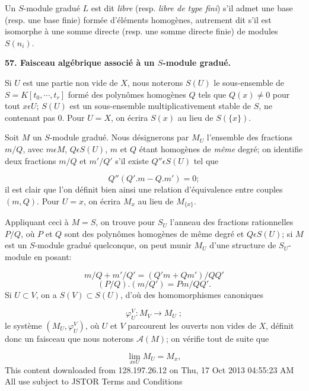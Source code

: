 Un $S$-module gradué $L$ est dit \textit{libre} (resp. \textit{libre de type fini}) s'il admet une base (resp. une base finie) formée d'éléments homogènes, autrement dit s'il est isomorphe à une somme directe (resp. une somme directe finie) de modules $S(n_i)$.


\textbf{57. Faisceau algébrique associé à un $S$-module gradué.}

Si $U$ est une partie non vide de $X$, nous noterons $S(U)$ le sous-ensemble de $S = K[t_0 , \cdots , t_r]$ formé des polynômes homogènes $Q$ tels que $Q(x) \neq 0$ pour tout $x \epsilon U$; $S(U)$ est un sous-ensemble multiplicativement stable de $S$, ne contenant pas 0. Pour $U = X$, on écrira $S(x)$ au lieu de $S(\{x\})$.

Soit $M$ un $S$-module gradué. Nous désignerons par $M_U$ l'ensemble des fractions $m/Q$, avec $m \epsilon M$, $Q \epsilon S(U)$, $m$ et $Q$ étant homogènes de \textit{même} degré; on identifie deux fractions $m/Q$ et $m'/Q'$ s'il existe $Q'' \epsilon S(U)$ tel que

\begin{equation*}
Q''(Q'.m - Q.m') = 0;
\end{equation*}
il est clair que l'on définit bien ainsi une relation d'équivalence entre couples $(m, Q)$. Pour $U = x$, on écrira $M_x$ au lieu de $M_{\{x\}}$.

Appliquant ceci à $M = S$, on trouve pour $S_U$ l'anneau des fractions rationnelles $P/Q$, où $P$ et $Q$ sont des polynômes homogènes de même degré et $Q \epsilon S(U)$; si $M$ est un $S$-module gradué quelconque, on peut munir $M_U$ d'une structure de $S_U$-module en posant:

\begin{equation*}
m/Q + m'/Q' = (Q'm + Qm')/QQ'
\end{equation*}
\begin{equation*}
(P/Q).(m/Q') = Pm/QQ'.
\end{equation*}
Si $U \subset V$, on a $S(V) \subset S(U)$, d'où des homomorphismes canoniques

\begin{equation*}
\varphi_U^V : M_V \to M_U \; ;
\end{equation*}
le système $(M_U , \varphi_U^V)$, où $U$ et $V$ parcourent les ouverts non vides de $X$, définit donc un faisceau que nous noterons $\mathcal{A}(M)$; on vérifie tout de suite que

\begin{equation*}
\lim_{x \epsilon U} M_U = M_x ,
\end{equation*}
This content downloaded from 128.197.26.12 on Thu, 17 Oct 2013 04:55:23 AM\\All use subject to JSTOR Terms and Conditions


